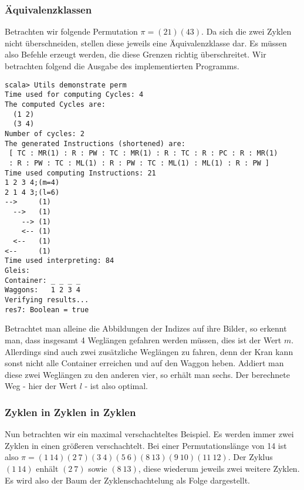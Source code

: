 \subsubsection*{Äquivalenzklassen}
Betrachten wir folgende Permutation $\pi = (2 1) (4 3)$.
Da sich die zwei Zyklen nicht überschneiden, stellen diese jeweils eine Äquivalenzklasse dar.
Es müssen also Befehle erzeugt werden, die diese Grenzen richtig überschreitet.
Wir betrachten folgend die Ausgabe des implementierten Programms.
\begin{lstlisting}
scala> Utils demonstrate perm                
Time used for computing Cycles: 4
The computed Cycles are: 
  (1 2)
  (3 4)
Number of cycles: 2
The generated Instructions (shortened) are: 
 [ TC : MR(1) : R : PW : TC : MR(1) : R : TC : R : PC : R : MR(1)
 : R : PW : TC : ML(1) : R : PW : TC : ML(1) : ML(1) : R : PW ] 
Time used computing Instructions: 21
1 2 3 4;(m=4)
2 1 4 3;(l=6)
-->     (1)
  -->   (1)
    --> (1)
    <-- (1)
  <--   (1)
<--     (1)
Time used interpreting: 84
Gleis: 
Container: _ _ _ _
Waggons:   1 2 3 4
Verifying results...
res7: Boolean = true
\end{lstlisting}
Betrachtet man alleine die Abbildungen der Indizes auf ihre Bilder, so erkennt man, dass insgesamt 4 Weglängen gefahren werden müssen, dies ist der Wert $m$.
Allerdings sind auch zwei zusätzliche Weglängen zu fahren, denn der Kran kann sonst nicht alle Container erreichen und auf den Waggon heben.
Addiert man diese zwei Weglängen zu den anderen vier, so erhält man sechs.
Der berechnete Weg - hier der Wert $l$ - ist also optimal.
\subsubsection*{Zyklen in Zyklen in Zyklen}
Nun betrachten wir ein maximal verschachteltes Beispiel.
Es werden immer zwei Zyklen in einen größeren verschachtelt.
Bei einer Permutationslänge von 14 ist also $\pi = (1\ 14)(2\ 7)(3\ 4)(5\ 6)(8\ 13)(9\ 10)(11\ 12)$.
Der Zyklus $(1\ 14)$ enhält $(2\ 7)$ sowie $(8\ 13)$, diese wiederum jeweils zwei weitere Zyklen.
Es wird also der Baum der Zyklenschachtelung als Folge dargestellt.

